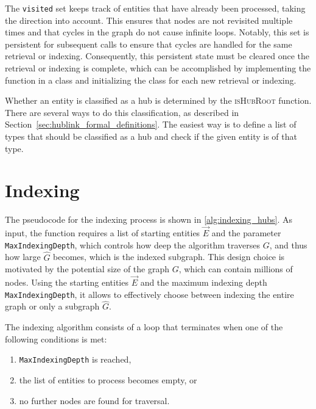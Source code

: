 \begin{tcolorbox}[title=Persistent State: \(\texttt{visited}\)]
The \texttt{visited} set keeps track of entities that have already been processed, taking the direction into account. This ensures that nodes are not revisited multiple times and that cycles in the graph do not cause infinite loops. Notably, this set is persistent for subsequent calls to ensure that cycles are handled for the same retrieval or indexing. Consequently, this persistent state must be cleared once the retrieval or indexing is complete, which can be accomplished by implementing the function in a class and initializing the class for each new retrieval or indexing.
\end{tcolorbox}

\begin{tcolorbox}[title=Function: \textsc{isHubRoot}]
Whether an entity is classified as a hub is determined by the \textsc{isHubRoot} function. There are several ways to do this classification, as described in Section~\ref{sec:hublink_formal_definitions}. The easiest way is to define a list of types that should be classified as a hub and check if the given entity is of that type.
\end{tcolorbox}




\section{Indexing}
\label{sec:hublink_indexing}


The pseudocode for the indexing process is shown in \autoref{alg:indexing_hubs}. As input, the function requires a list of starting entities \(\vec{E}\) and the parameter \texttt{MaxIndexingDepth}, which controls how deep the algorithm traverses \(G\), and thus how large \(\hat{G}\) becomes, which is the indexed subgraph. This design choice is motivated by the potential size of the graph \(G\), which can contain millions of nodes. Using the starting entities \(\vec{E}\) and the maximum indexing depth \texttt{MaxIndexingDepth}, it allows to effectively choose between indexing the entire graph or only a subgraph \(\hat{G}\).

The indexing algorithm consists of a loop that terminates when one of the following conditions is met:
\begin{enumerate}
    \item \texttt{MaxIndexingDepth} is reached,
    \item the list of entities to process becomes empty, or
    \item no further nodes are found for traversal.
\end{enumerate}

